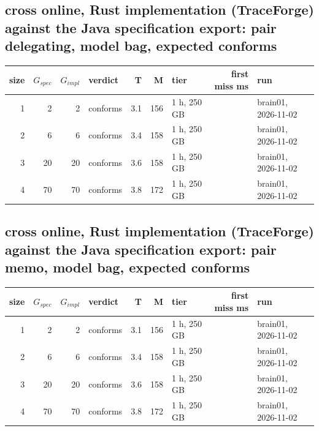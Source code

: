 \documentclass[10pt]{article}
\begin{document}
\subsection*{cross online, Rust implementation (TraceForge) against the Java specification export: pair \textsf{delegating}, model bag, expected conforms}
\begin{longtable}{@{}rrrlrrlrl@{}}
\toprule
size & $G_{\mathit{spec}}$ & $G_{\mathit{impl}}$ & verdict & T & M & tier & first miss ms & run \\
\midrule
\endhead
\color{red} 1 & 2 & 2 & conforms & 3.1 & 156 & 1 h, 250 GB &  & brain01, 2026-11-02 \\
\color{red} 2 & 6 & 6 & conforms & 3.4 & 158 & 1 h, 250 GB &  & brain01, 2026-11-02 \\
\color{red} 3 & 20 & 20 & conforms & 3.6 & 158 & 1 h, 250 GB &  & brain01, 2026-11-02 \\
\color{red} 4 & 70 & 70 & conforms & 3.8 & 172 & 1 h, 250 GB &  & brain01, 2026-11-02 \\
\bottomrule
\end{longtable}
\subsection*{cross online, Rust implementation (TraceForge) against the Java specification export: pair \textsf{memo}, model bag, expected conforms}
\begin{longtable}{@{}rrrlrrlrl@{}}
\toprule
size & $G_{\mathit{spec}}$ & $G_{\mathit{impl}}$ & verdict & T & M & tier & first miss ms & run \\
\midrule
\endhead
\color{red} 1 & 2 & 2 & conforms & 3.1 & 156 & 1 h, 250 GB &  & brain01, 2026-11-02 \\
\color{red} 2 & 6 & 6 & conforms & 3.4 & 158 & 1 h, 250 GB &  & brain01, 2026-11-02 \\
\color{red} 3 & 20 & 20 & conforms & 3.6 & 158 & 1 h, 250 GB &  & brain01, 2026-11-02 \\
\color{red} 4 & 70 & 70 & conforms & 3.8 & 172 & 1 h, 250 GB &  & brain01, 2026-11-02 \\
\bottomrule
\end{longtable}
\end{document}
